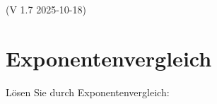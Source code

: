 

\renewcommand{\bbwAufgabenBlockID}{GL\_Ex}


\usepackage{amssymb} %

\renewcommand{\metaHeaderLine}{Arbeitsblatt}
\renewcommand{\arbeitsblattTitel}{Exponentialgleichungen}


\ifisNURAUFGABEN
\renewcommand{\abplz}[1]{\vspace{1mm}}
\fi


\newcommand{\seitenUmbruchImAufgabenteil}{
\ifisNURAUFGABEN
\else
\noTRAINER{\newpage}
\fi
}%



\arbeitsblattHeader{} (V 1.7 2025-10-18)

\section{Exponentenvergleich}


Lösen Sie durch Exponentenvergleich:

